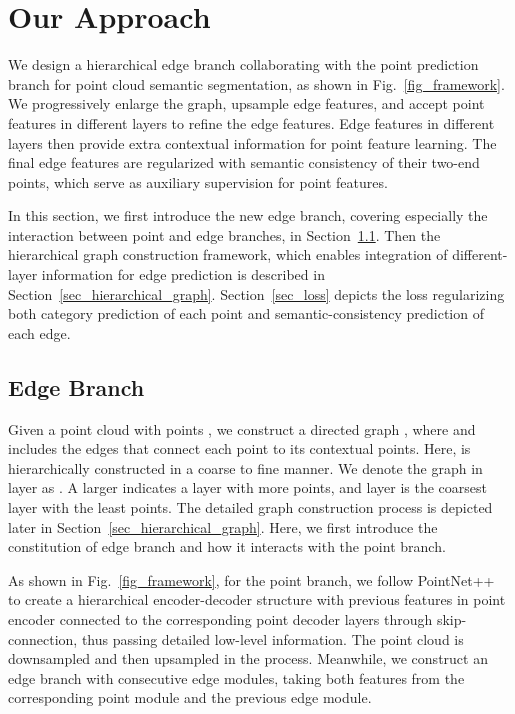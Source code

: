\documentclass[10pt,twocolumn,letterpaper]{article}
\begin{document}
\section{Our Approach}

We design a hierarchical edge branch collaborating with the point prediction branch for point cloud semantic segmentation, as shown in Fig.~\ref{fig_framework}. 
We progressively enlarge the graph, upsample edge features, and accept point features in different layers to refine the edge features. Edge features in different layers then provide extra contextual information for point feature learning. The final edge features are regularized with semantic consistency of their two-end points, which serve as auxiliary supervision for point features.  

In this section, we first introduce the new edge branch, covering especially the interaction between point and edge branches, in Section~\ref{sec_edge_branch}.
Then the hierarchical graph construction framework, which enables integration of different-layer information for edge prediction is described in Section~\ref{sec_hierarchical_graph}. Section~\ref{sec_loss} depicts the loss regularizing both category prediction of each point and semantic-consistency prediction of each edge.


\subsection{Edge Branch}
\label{sec_edge_branch}

Given a point cloud with  points , we construct a directed graph , where  and  includes the edges that connect each point to its contextual points. Here,  is hierarchically constructed in a coarse to fine manner.
We denote the graph in layer  as . A larger  indicates a layer with more points, and layer  is the coarsest layer with the least points. The detailed graph construction process is depicted later in Section~\ref{sec_hierarchical_graph}. Here, we first introduce the constitution of edge branch and how it interacts with the point branch.

As shown in Fig.~\ref{fig_framework}, for the point branch, we follow PointNet++~\cite{pointnet2} to create a hierarchical encoder-decoder structure with previous features in point encoder connected to the corresponding point decoder layers through skip-connection, thus passing detailed low-level information. The point cloud is downsampled and then upsampled in the process. Meanwhile, we construct an edge branch with consecutive edge modules, taking both features from the corresponding point module and the previous edge module. 
\end{document}
